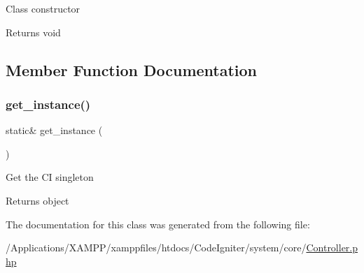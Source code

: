 Class constructor

\begin{DoxyReturn}{Returns}
void 
\end{DoxyReturn}


\subsection{Member Function Documentation}
\mbox{\label{class_c_i___controller_a8d3cc57e7b6ec94e704712b0f277f5bb}} 
\subsubsection{\texorpdfstring{get\+\_\+instance()}{get\_instance()}}
{\footnotesize\ttfamily static\& get\+\_\+instance (\begin{DoxyParamCaption}{ }\end{DoxyParamCaption})\hspace{0.3cm}{\ttfamily [static]}}

Get the CI singleton

\begin{DoxyReturn}{Returns}
object 
\end{DoxyReturn}


The documentation for this class was generated from the following file\+:\begin{DoxyCompactItemize}
\item 
/\+Applications/\+X\+A\+M\+P\+P/xamppfiles/htdocs/\+Code\+Igniter/system/core/\mbox{\hyperlink{_controller_8php}{Controller.\+php}}\end{DoxyCompactItemize}

